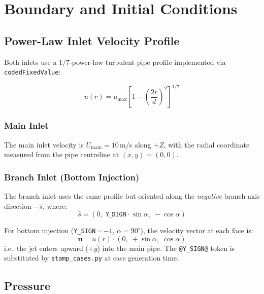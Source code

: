 \documentclass[12pt,a4paper]{report}
\begin{document}
\chapter{Boundary and Initial Conditions}
\label{ch:bc}

\section{Power-Law Inlet Velocity Profile}

Both inlets use a $1/7$-power-law turbulent pipe profile implemented
via \texttt{codedFixedValue}:

\begin{equation}
  u(r) = u_{\max}\!\left[1 - \left(\frac{2r}{d}\right)^{\!2}\right]^{1/7}
  \label{eq:powerlaw}
\end{equation}

\subsection{Main Inlet}

The main inlet velocity is $U_{\mathrm{main}} = 10$\,m/s along $+Z$,
with the radial coordinate measured from the pipe centreline at
$(x, y) = (0, 0)$.

\subsection{Branch Inlet (Bottom Injection)}

The branch inlet uses the same profile but oriented along the
\emph{negative} branch-axis direction $-\hat{s}$, where:
\[
  \hat{s} = (0,\; \texttt{Y\_SIGN} \cdot \sin\alpha,\; -\cos\alpha)
\]

For bottom injection (\texttt{Y\_SIGN}\,=\,$-1$, $\alpha = 90^{\circ}$),
the velocity vector at each face is:
\[
  \mathbf{u} = u(r) \cdot (0,\; +\sin\alpha,\; \cos\alpha)
\]
i.e.\ the jet enters upward ($+y$) into the main pipe.  The
\texttt{@Y\_SIGN@} token is substituted by \texttt{stamp\_cases.py}
at case generation time.


\section{Pressure}
\end{document}

